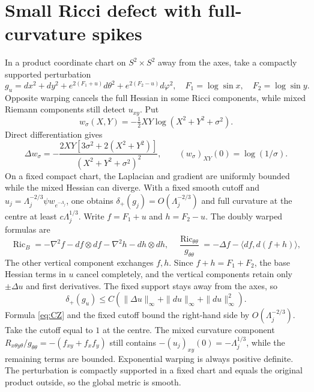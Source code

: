 \documentclass[a4paper,11pt]{article}
\numberwithin{equation}{section}
\theoremstyle{definition}
\newcommand{\Ric}{\operatorname{Ric}}
\begin{document}
\section{Small Ricci defect with full-curvature spikes}\label{sec:curvature-spikes}
In a product coordinate chart on $S^2\times S^2$ away from the axes, take a compactly supported perturbation
\[
g_u=dx^2+dy^2+e^{2(F_1+u)}d\theta^2+e^{2(F_2-u)}d\varphi^2,
\quad F_1=\log\sin x,\quad F_2=\log\sin y.
\]
Opposite warping cancels the full Hessian in some Ricci components, while mixed Riemann components still detect $u_{xy}$. Put
\[
w_\sigma(X,Y)=-\tfrac12XY\log(X^2+Y^2+\sigma^2).
\]
Direct differentiation gives
\begin{equation}\label{eq:CZ}
\Delta w_\sigma=-\frac{2XY[3\sigma^2+2(X^2+Y^2)]}{(X^2+Y^2+\sigma^2)^2},
\qquad (w_\sigma)_{XY}(0)=\log(1/\sigma).
\end{equation}
On a fixed compact chart, the Laplacian and gradient are uniformly bounded while the mixed Hessian can diverge. With a fixed smooth cutoff and $u_j=\Lambda_j^{-2/3}\psi w_{e^{-\Lambda_j}}$, one obtains $\delta_+(g_j)=O(\Lambda_j^{-2/3})$ and full curvature at the centre at least $c\Lambda_j^{1/3}$. Write $f=F_1+u$ and $h=F_2-u$. The doubly warped formulas are
\[
\Ric_B=-\nabla^2f-df\otimes df-\nabla^2h-dh\otimes dh,\quad
\frac{\Ric_{\theta\theta}}{g_{\theta\theta}}
=-\Delta f-\langle df,d(f+h)\rangle,
\]
The other vertical component exchanges $f,h$. Since $f+h=F_1+F_2$, the base Hessian terms in $u$ cancel completely, and the vertical components retain only $\pm\Delta u$ and first derivatives. The fixed support stays away from the axes, so
\[
\delta_+(g_u)\le C(\|\Delta u\|_\infty+\|du\|_\infty+\|du\|_\infty^2).
\]
Formula \eqref{eq:CZ} and the fixed cutoff bound the right-hand side by $O(\Lambda_j^{-2/3})$.
Take the cutoff equal to $1$ at the centre. The mixed curvature component
$R_{x\theta y\theta}/g_{\theta\theta}
=-(f_{xy}+f_xf_y)$ still contains
$-(u_j)_{xy}(0)=-\Lambda_j^{1/3}$, while the remaining terms are bounded.
Exponential warping is always positive definite. The perturbation is compactly supported in a fixed chart and equals the original product outside, so the global metric is smooth.
\end{document}
